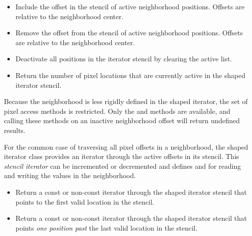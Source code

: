 {\begin{itemize}

\item \textbf{} Include the offset
 in the stencil of active neighborhood positions.  Offsets are relative
to the neighborhood center.

\item \textbf{} Remove the offset
 from the stencil of active neighborhood positions.  Offsets are
relative to the neighborhood center. 

\item \textbf{} Deactivate all positions in the
iterator stencil by clearing the active list.

\item \textbf{} Return the number
of pixel locations that are currently active in the shaped iterator stencil.

\end{itemize}

Because the neighborhood is less rigidly defined in the shaped iterator, the
set of pixel access methods is restricted.  Only the  and
 methods are available, and calling these methods on an 
inactive neighborhood offset will return undefined results.

For the common case of traversing all pixel offsets in a neighborhood, the
shaped iterator class provides an iterator through the active offsets in its
stencil.   This \emph{stencil iterator} can be incremented or decremented and
defines  and  for reading and writing the values in the
neighborhood.

\begin{itemize}
\item \textbf{} Return a
const or non-const iterator through the shaped iterator stencil that points to
the first valid location in the stencil.

\item \textbf{} Return a
const or non-const iterator through the shaped iterator stencil that points
\emph{one position past} the last valid location in the stencil.
\end{itemize}

}
